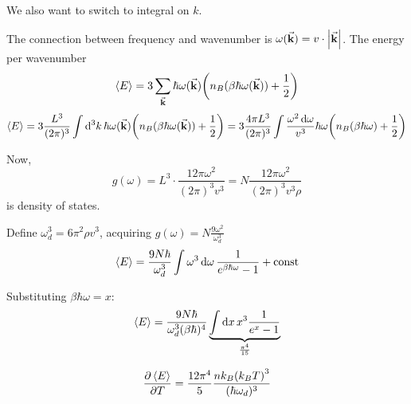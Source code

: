We also want to switch to integral on $k$.

The connection between frequency and wavenumber is $\omega(\va{k}) = v\cdot \abs{\va{k}}$. The energy per wavenumber
$$\expval{E} = 3\sum_{\va{k}} \hbar \omega(\va{k}) \qty(n_B(\beta\hbar\omega(\va{k}))+\frac{1}{2}) $$
$$\expval{E} = 3\frac{L^3}{(2\pi)^3} \int \dd[3]{k} \hbar \omega(\va{k}) \qty(n_B(\beta\hbar\omega(\va{k}))+\frac{1}{2}) =3 \frac{4\pi L^3}{(2\pi)^3} \int \frac{\omega^2 \dd{\omega}}{v^3} \hbar \omega  \qty(n_B(\beta\hbar\omega)+\frac{1}{2})$$

Now,
$$g(\omega) = L^3 \cdot \frac{12\pi \omega^2}{(2\pi)^3 v^3} = N \frac{12\pi \omega^2}{(2\pi)^3 v^3\rho}$$
is density of states.

Define $\omega_d^3 = 6\pi^2 \rho v^3$, acquiring $g(\omega) = N\frac{9\omega^2}{\omega_d^3} $
$$\expval{E} = \frac{9N\hbar }{\omega_d^3} \int \omega^3 \dd{\omega} \frac{1}{e^{\beta \hbar\omega }-1} + \text{const}$$

Substituting $\beta \hbar \omega = x$:
$$\expval{E} = \frac{9N\hbar }{\omega_d^3 (\beta \hbar)^4} \underbrace{\int \dd{x} x^3 \frac{1}{e^x-1}}_{\frac{\pi^4}{15}} $$

$$\pdv{\expval{E}}{T} = \frac{12\pi^4}{5}\frac{nk_B \qty(k_BT)^3}{(\hbar \omega_d)^3} $$